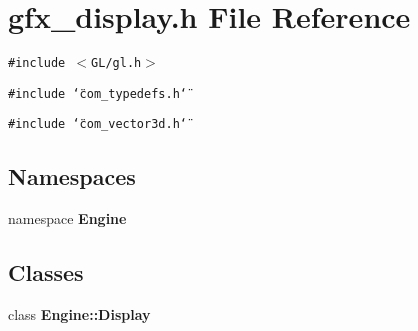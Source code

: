 \section{gfx\_\-display.h File Reference}
\label{gfx__display_8h}
{\tt \#include $<$GL/gl.h$>$}\par
{\tt \#include \char`\"{}com\_\-typedefs.h\char`\"{}}\par
{\tt \#include \char`\"{}com\_\-vector3d.h\char`\"{}}\par
\subsection*{Namespaces}
\begin{CompactItemize}
\item 
namespace {\bf Engine}
\end{CompactItemize}
\subsection*{Classes}
\begin{CompactItemize}
\item 
class {\bf Engine::Display}
\end{CompactItemize}
